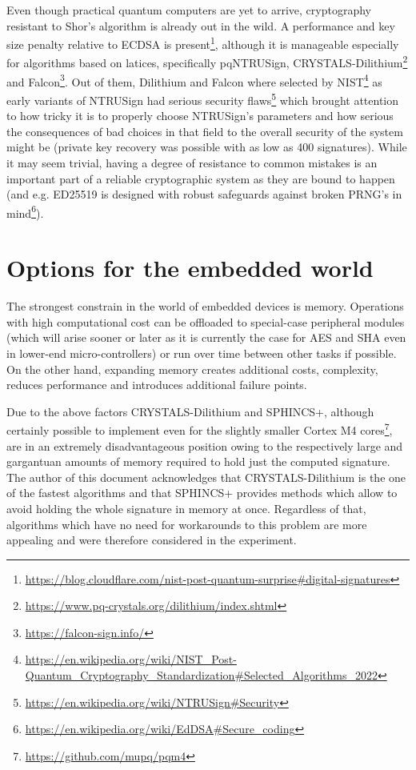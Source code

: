 \documentclass[
]{article}
\begin{document}
Even though practical quantum computers are yet to arrive, cryptography resistant to Shor's algorithm is already out in the wild. A performance and key size penalty relative to ECDSA is
present\footnote{\url{https://blog.cloudflare.com/nist-post-quantum-surprise\#digital-signatures}},
although it is manageable especially for algorithms based on latices, specifically pqNTRUSign, CRYSTALS-Dilithium\footnote{\url{https://www.pq-crystals.org/dilithium/index.shtml}} and Falcon\footnote{\url{https://falcon-sign.info/}}.
Out of them, Dilithium and Falcon where selected by NIST\footnote{\url{https://en.wikipedia.org/wiki/NIST_Post-Quantum_Cryptography_Standardization\#Selected_Algorithms_2022}} as early variants of NTRUSign
had serious security flaws\footnote{\url{https://en.wikipedia.org/wiki/NTRUSign\#Security}} which brought
attention to how tricky it is to properly choose NTRUSign's parameters and how serious the consequences
of bad choices in that field to the overall security of the system might be (private key recovery was possible with as low as 400 signatures).
While it may seem trivial, having a degree of resistance to common mistakes is an important part of a reliable cryptographic system as they are bound to happen (and e.g. ED25519 is designed with robust
safeguards against broken PRNG's in mind\footnote{\url{https://en.wikipedia.org/wiki/EdDSA\#Secure_coding}}).

\hypertarget{embedded-options}{%
\section{Options for the embedded world}\label{embedded-options}}

The strongest constrain in the world of embedded devices is memory. Operations with high computational
cost can be offloaded to special-case peripheral modules (which will arise sooner or later as it is
currently the case for AES and SHA even in lower-end micro-controllers) or run over time between other
tasks if possible. On the other hand, expanding memory creates additional costs, complexity, reduces
performance and introduces additional failure points.

Due to the above factors CRYSTALS-Dilithium and SPHINCS+, although certainly possible to implement even
for the slightly smaller Cortex M4 cores\footnote{\url{https://github.com/mupq/pqm4}}, are in an
extremely disadvantageous position owing to the respectively large and gargantuan amounts of memory
required to hold just the computed signature. The author of this document acknowledges that CRYSTALS-Dilithium is the one of the fastest algorithms and that SPHINCS+ provides methods which allow to avoid holding the whole signature in memory at once. Regardless of that, algorithms which have no need for workarounds to this problem are more appealing and were therefore considered in the experiment.
\end{document}
